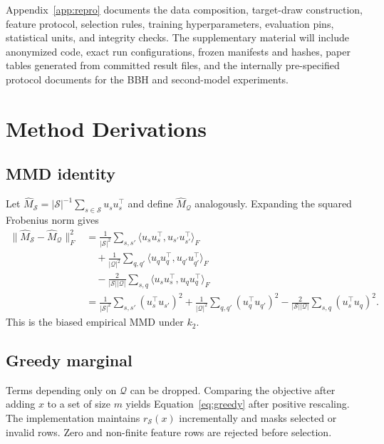 \documentclass{article}
\begin{document}
Appendix~\ref{app:repro} documents the data composition, target-draw
construction, feature protocol, selection rules, training hyperparameters,
evaluation pins, statistical units, and integrity checks. The supplementary
material will include anonymized code, exact run configurations, frozen
manifests and hashes, paper tables generated from committed result files, and
the internally pre-specified protocol documents for the BBH and second-model
experiments.




\appendix

\section{Method Derivations}
\label{app:derivations}

\subsection{MMD identity}

Let
$\widehat M_{\mathcal S}=|\mathcal S|^{-1}\sum_{s\in\mathcal S}u_su_s^\top$
and define $\widehat M_{\mathcal Q}$ analogously. Expanding the squared
Frobenius norm gives
\begin{align}
\|\widehat M_{\mathcal S}-\widehat M_{\mathcal Q}\|_F^2
&=
\frac{1}{|\mathcal S|^2}\sum_{s,s'}
\langle u_su_s^\top,u_{s'}u_{s'}^\top\rangle_F \nonumber\\
&\quad+
\frac{1}{|\mathcal Q|^2}\sum_{q,q'}
\langle u_qu_q^\top,u_{q'}u_{q'}^\top\rangle_F \nonumber\\
&\quad-
\frac{2}{|\mathcal S||\mathcal Q|}\sum_{s,q}
\langle u_su_s^\top,u_qu_q^\top\rangle_F \\
&=
\frac{1}{|\mathcal S|^2}\sum_{s,s'}(u_s^\top u_{s'})^2
+\frac{1}{|\mathcal Q|^2}\sum_{q,q'}(u_q^\top u_{q'})^2
-\frac{2}{|\mathcal S||\mathcal Q|}\sum_{s,q}(u_s^\top u_q)^2.
\end{align}
This is the biased empirical MMD under $k_2$.

\subsection{Greedy marginal}

Terms depending only on $\mathcal Q$ can be dropped. Comparing the objective
after adding $x$ to a set of size $m$ yields Equation~\ref{eq:greedy} after
positive rescaling. The implementation maintains $r_{\mathcal S}(x)$
incrementally and masks selected or invalid rows. Zero and non-finite feature
rows are rejected before selection.
\end{document}
